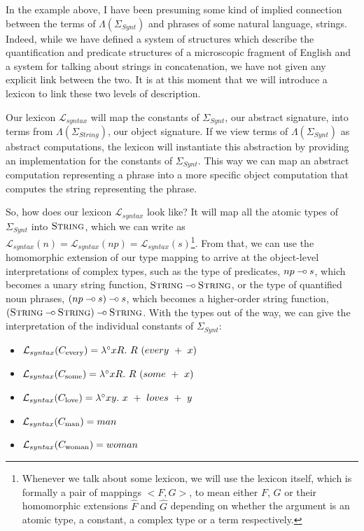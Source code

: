 In the example above, I have been presuming some kind of implied
connection between the terms of $\Lambda(\Sigma_{Synt})$ and phrases of
some natural language, strings. Indeed, while we have defined a system
of structures which describe the quantification and predicate structures
of a microscopic fragment of English and a system for talking about
strings in concatenation, we have not given any explicit link between
the two. It is at this moment that we will introduce a lexicon to link
these two levels of description.

Our lexicon $\mathcal{L}_{syntax}$ will map the constants of
$\Sigma_{Synt}$, our abstract signature, into terms from
$\Lambda(\Sigma_{String})$, our object signature. If we view terms of
$\Lambda(\Sigma_{Synt})$ as abstract computations, the lexicon will
instantiate this abstraction by providing an implementation for the
constants of $\Sigma_{Synt}$. This way we can map an abstract
computation representing a phrase into a more specific object
computation that computes the string representing the phrase.

So, how does our lexicon $\mathcal{L}_{syntax}$ look like? It will map
all the atomic types of $\Sigma_{Synt}$ into $\textsc{String}$, which we
can write as $\mathcal{L}_{syntax}(n) = \mathcal{L}_{syntax}(np) =
\mathcal{L}_{syntax}(s)$\footnote{Whenever we talk about some lexicon,
  we will use the lexicon itself, which is formally a pair of mappings
  $\mathopen{<}F, G\mathclose{>}$, to mean either $F$, $G$ or their
  homomorphic extensions $\hat{F}$ and $\hat{G}$ depending on whether
  the argument is an atomic type, a constant, a complex type or a term
  respectively.}. From that, we can use the homomorphic extension of our
type mapping to arrive at the object-level interpretations of complex
types, such as the type of predicates, $np \mathbin{{-}\mkern-3.5mu{\circ}} s$, which becomes a
unary string function, $\textsc{String} \mathbin{{-}\mkern-3.5mu{\circ}} \textsc{String}$, or the
type of quantified noun phrases, $(np \mathbin{{-}\mkern-3.5mu{\circ}} s) \mathbin{{-}\mkern-3.5mu{\circ}} s$, which becomes a
higher-order string function, $(\textsc{String} \mathbin{{-}\mkern-3.5mu{\circ}} \textsc{String})
\mathbin{{-}\mkern-3.5mu{\circ}} \textsc{String}$. With the types out of the way, we can give the
interpretation of the individual constants of $\Sigma_{Synt}$:
\begin{itemize}
\item $\mathcal{L}_{syntax}(C_{\textrm{every}}) = \lambda^{\circ} x
  R.\ R\ (every\ +\ x)$
\item $\mathcal{L}_{syntax}(C_{\textrm{some}}) = \lambda^{\circ} x
  R.\ R\ (some\ +\ x)$
\item $\mathcal{L}_{syntax}(C_{\textrm{love}}) = \lambda^{\circ} x
  y.\ x\ +\ loves\ +\ y$
\item $\mathcal{L}_{syntax}(C_{\textrm{man}}) = man$
\item $\mathcal{L}_{syntax}(C_{\textrm{woman}}) = woman$
\end{itemize}

